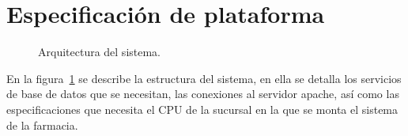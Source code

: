 \section{Especificación de plataforma}	




\begin{figure}[htbp!]
	\begin{center}
		\caption{Arquitectura del sistema.}
		\label{fig:arquitectura}
	\end{center}
\end{figure}

En la figura~\ref{fig:arquitectura} se describe la estructura del sistema, en ella se detalla los servicios de base de datos que se necesitan, las conexiones al servidor apache, así como las especificaciones que necesita el CPU de la sucursal en la que se monta el sistema de la farmacia.



